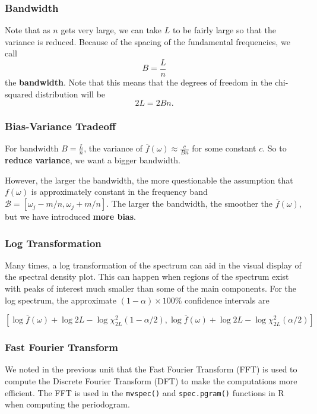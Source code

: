 \documentclass[%
xcolor=pdftex]{beamer}
\begin{document}
\begin{frame}
\frametitle{Bandwidth}

Note that as $n$ gets very large, we can take $L$ to be fairly
large so that the variance is reduced. Because of the spacing of the fundamental
frequencies, we call
\begin{equation} \label{eq:bandwidth}
B=\frac{L}{n}
\end{equation}
the \textbf{bandwidth}. Note that this means that the degrees of freedom
in the chi-squared distribution will be
$$
2L=2 B n.
$$

\end{frame}

\begin{frame}
\frametitle{Bias-Variance Tradeoff}

For bandwidth $B=\frac{L}{n}$, the variance of $\overline{f}(\omega) \approx \frac{c}{B n}$ for some constant $c$. So to \textbf{reduce variance}, we want a bigger bandwidth. \\
\vspace{5mm}

However, the larger the bandwidth, the more questionable the assumption that $f(\omega)$ is approximately constant in the frequency band $\mathcal{B}=[\omega_j-m/n, \omega_j+m/n]$. The larger the bandwidth, the smoother the $\overline{f}(\omega)$, but we have introduced \textbf{more bias}.

\end{frame}

\begin{frame}
\frametitle{Log Transformation}

Many times, a log transformation of the spectrum can aid in the visual display of the spectral density plot. This can happen when regions of the spectrum exist with peaks of interest much smaller than some of the main components. For the log spectrum, the approximate $(1-\alpha) \times 100\%$ confidence intervals are

\begin{equation} \label{eq:CIlog}
[ \log \overline{f}(\omega)  + \log 2L  - \log \chi_{2L}^2(1-\alpha/2) , \log \overline{f}(\omega) + \log 2L - \log \chi_{2L}^2(\alpha/2) ]
\end{equation}

\end{frame}

\begin{frame} [fragile]
\frametitle{Fast Fourier Transform}

We noted in the previous unit that the Fast Fourier Transform (FFT) is used to compute the Discrete Fourier Transform (DFT) to make the computations more efficient. The FFT is used in the \verb=mvspec()= and \verb=spec.pgram()= functions in R when computing the periodogram.



\end{frame}
\end{document}
